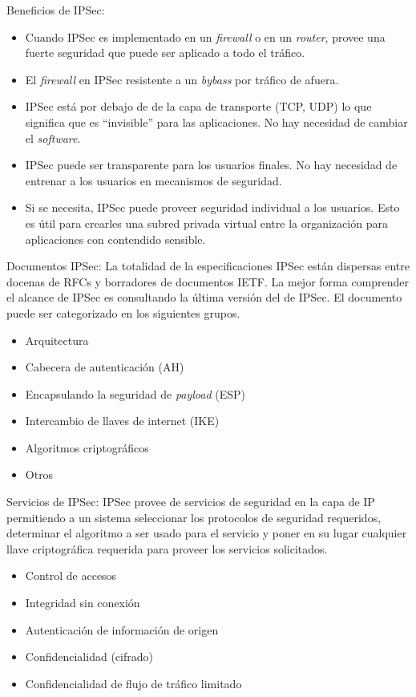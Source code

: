 \documentclass[11pt,letterpaper]{article}
\begin{document}
Beneficios de IPSec:
\begin{itemize}
    \item Cuando IPSec es implementado en un \textit{firewall} o en un \textit{router}, provee una fuerte seguridad
    que puede ser aplicado a todo el tráfico.
    \item El \textit{firewall} en IPSec resistente a un \textit{bybass} por tráfico de afuera.
    \item IPSec está por debajo de de la capa de transporte (TCP, UDP) lo que significa que es ``invisible'' para
    las aplicaciones. No hay necesidad de cambiar el \textit{software}.
    \item IPSec puede ser transparente para los usuarios finales. No hay necesidad de entrenar a los usuarios
    en mecanismos de seguridad.
    \item Si se necesita, IPSec puede proveer seguridad individual a los usuarios. Esto es útil para crearles una
    subred privada virtual entre la organización para aplicaciones con contendido sensible. 
\end{itemize}

Documentos IPSec:
La totalidad de la especificaciones IPSec están dispersas entre docenas de RFCs y borradores de documentos IETF. La
mejor forma comprender el alcance de IPSec es consultando la última versión del de IPSec.
El documento puede ser categorizado en los siguientes grupos.
\begin{itemize}
    \item Arquitectura
    \item Cabecera de autenticación (AH)
    \item Encapsulando la seguridad de \textit{payload} (ESP)
    \item Intercambio de llaves de internet (IKE)
    \item Algoritmos criptográficos
    \item Otros
\end{itemize}

Servicios de IPSec:
IPSec provee de servicios de seguridad en la capa de IP permitiendo a un sistema seleccionar los protocolos de
seguridad requeridos, determinar el algoritmo a ser usado para el servicio y poner en su lugar cualquier llave
criptográfica requerida para proveer los servicios solicitados.
\begin{itemize}
    \item Control de accesos
    \item Integridad sin conexión
    \item Autenticación de información de origen
    \item Confidencialidad (cifrado)
    \item Confidencialidad de flujo de tráfico limitado
\end{itemize}
\end{document}
